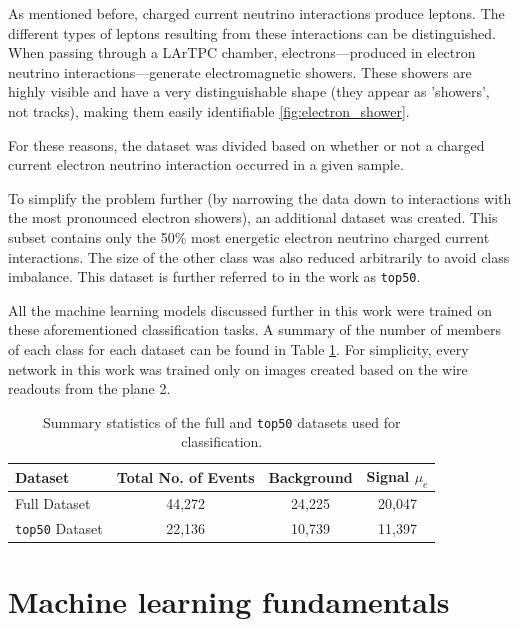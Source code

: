 \documentclass{pracalicmgr}
\begin{document}
As mentioned before, charged current neutrino interactions produce leptons. The different types of leptons resulting from these interactions can be distinguished. When passing through a LArTPC chamber, electrons—produced in electron neutrino interactions—generate electromagnetic showers. These showers are highly visible and have a very distinguishable shape (they appear as 'showers', not tracks), making them easily identifiable \ref{fig:electron_shower}.

For these reasons, the dataset was divided based on whether or not a charged current electron neutrino interaction occurred in a given sample.

To simplify the problem further (by narrowing the data down to interactions with the most pronounced electron showers), an additional dataset was created. This subset contains only the 50\% most energetic electron neutrino charged current interactions. The size of the other class was also reduced arbitrarily to avoid class imbalance. This dataset is further referred to in the work as \texttt{top50}.

All the machine learning models discussed further in this work were trained on these aforementioned classification tasks. A summary of the number of members of each class for each dataset can be found in Table \ref{tab:dataset_stats}. For simplicity, every network in this work was trained only on images created based on the wire readouts from the plane 2.

\begin{table}[h]
    \centering
    \caption{Summary statistics of the full and \texttt{top50} datasets used for classification.}
    \label{tab:dataset_stats}
    \begin{tabular}{lccc}
        \toprule
        \textbf{Dataset} & \textbf{Total No. of Events} & \textbf{Background} & \textbf{Signal $\mu_e$ } \\
        \midrule
        Full Dataset     & 44,272                 & 24,225 & 20,047 \\
        \texttt{top50} Dataset & 22,136                 & 10,739 & 11,397 \\
        \bottomrule
    \end{tabular}
\end{table}

\chapter{Machine learning fundamentals}
\end{document}
